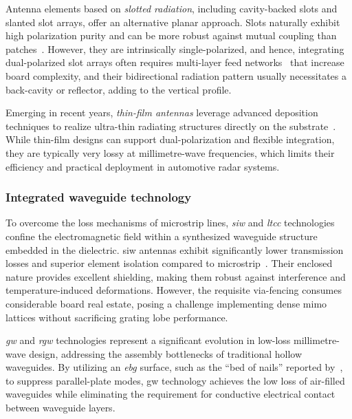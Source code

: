 Antenna elements based on \emph{slotted radiation}, including cavity-backed slots and slanted slot arrays, offer an alternative planar approach.
Slots naturally exhibit high polarization purity and can be more robust against mutual coupling than patches~\parencite{sunWidebandCavitySlottedWaveguide2024,liDesignImplementationSIW2019}.
However, they are intrinsically single-polarized, and hence, integrating dual-polarized slot arrays often requires multi-layer feed networks~\parencite{ferreiraCompactDualCircularlyPolarized2017} that increase board complexity, and their bidirectional radiation pattern usually necessitates a back-cavity or reflector, adding to the vertical profile.

Emerging in recent years, \emph{thin-film antennas} leverage advanced deposition techniques to realize ultra-thin radiating structures directly on the substrate~\parencite{khanHybridThinFilm2017}.
While thin-film designs can support dual-polarization and flexible integration, they are typically very lossy at millimetre-wave frequencies, which limits their efficiency and practical deployment in automotive radar systems.


\subsubsection{Integrated waveguide technology}

To overcome the loss mechanisms of microstrip lines, \emph{\gls{siw}} and \emph{\gls{ltcc}} technologies confine the electromagnetic field within a synthesized waveguide structure embedded in the dielectric.
\gls{siw} antennas exhibit significantly lower transmission losses and superior element isolation compared to microstrip~\parencite{saeidi-maneshLowCrossPolarizationHighIsolation2019}.
Their enclosed nature provides excellent shielding, making them robust against interference and temperature-induced deformations.
However, the requisite via-fencing consumes considerable board real estate, posing a challenge implementing dense \gls{mimo} lattices without sacrificing grating lobe performance.

\emph{\Gls{gw}} and \emph{\gls{rgw}} technologies represent a significant evolution in low-loss millimetre-wave design, addressing the assembly bottlenecks of traditional hollow waveguides.
By utilizing an \emph{\gls{ebg}} surface, such as the \enquote{bed of nails} reported by~\textcite{kildalDesignExperimentalVerification2011}, to suppress parallel-plate modes, \gls{gw} technology achieves the low loss of air-filled waveguides while eliminating the requirement for conductive electrical contact between waveguide layers.

